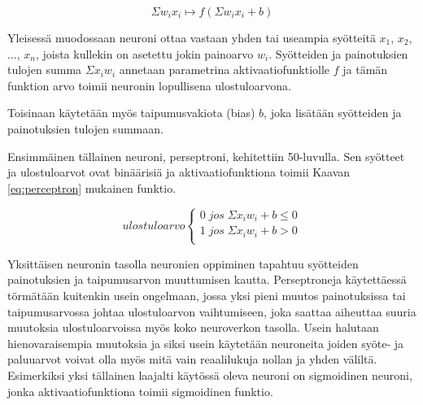 \documentclass[11pt]{article}
\theoremstyle{plain}
\theoremstyle{definition}
\begin{document}
    \begin{equation}
      \label{eq:neuroni}
      \Sigma w_i x_i \mapsto f(\Sigma w_i x_i + b)
    \end{equation}

    Yleisessä muodossaan neuroni ottaa vastaan yhden tai useampia syötteitä $x_1$, $x_2$, ..., $x_n$, joista kullekin on asetettu jokin painoarvo $w_i$. Syötteiden ja painotuksien tulojen summa $\Sigma x_i w_i$ annetaan parametrina aktivaatiofunktiolle $f$ ja tämän funktion arvo toimii neuronin lopullisena ulostuloarvona.

    Toisinaan käytetään myös taipumusvakiota (bias) $b$, joka lisätään syötteiden ja painotuksien tulojen summaan.



    Ensimmäinen tällainen neuroni, perseptroni, kehitettiin 50-luvulla. Sen syötteet ja ulostuloarvot ovat binäärisiä ja aktivaatiofunktiona toimii Kaavan \ref{eq:perceptron} mukainen funktio.

    \begin{equation}
      \label{eq:perceptron}
      ulostuloarvo
      \begin{cases}
        0\; jos \; \Sigma x_i w_i + b \leq 0 \\
        1\; jos \; \Sigma x_i w_i + b > 0 \\
      \end{cases}
    \end{equation}

    Yksittäisen neuronin tasolla neuronien oppiminen tapahtuu syötteiden painotuksien ja taipumusarvon muuttumisen kautta. Perseptroneja käytettäessä törmätään kuitenkin usein ongelmaan, jossa yksi pieni muutos painotuksissa tai taipumusarvossa johtaa ulostuloarvon vaihtumiseen, joka saattaa aiheuttaa suuria muutoksia ulostuloarvoissa myös koko neuroverkon tasolla. Usein halutaan hienovaraisempia muutoksia ja siksi usein käytetään neuroneita joiden syöte- ja paluuarvot voivat olla myös mitä vain reaalilukuja nollan ja yhden väliltä. Esimerkiksi yksi tällainen laajalti käytössä oleva neuroni on sigmoidinen neuroni, jonka aktivaatiofunktiona toimii sigmoidinen funktio.


\end{document}
